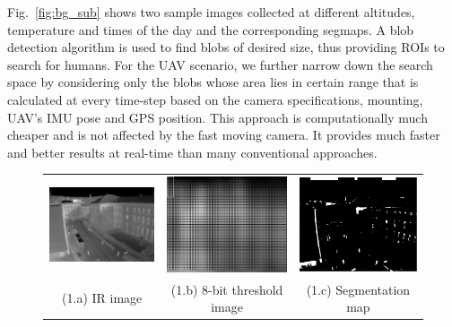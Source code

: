 \documentclass[runningheads]{llncs}
\begin{document}
Fig.~\ref{fig:bg_sub} shows two sample images collected at different altitudes, temperature and times of the day and the corresponding segmaps. A blob detection algorithm \cite{cvblob} is used to find blobs of desired size, thus providing ROIs to search for humans. For the UAV scenario, we further narrow down the search space by considering only the blobs whose area lies in certain range that is calculated at every time-step based on the camera specifications, mounting, UAV's IMU pose and GPS position. This approach is computationally much cheaper and is not affected by the fast moving camera. It provides much faster and better results at real-time than many conventional approaches.


\begin{figure}
  \centering
  \begin{tabular}{ccc}
    \includegraphics[width=4cm]{img/eps/bg_sub/CLA_Infrared_Image_screenshot_03-08-2015.eps} &
    \includegraphics[width=4cm]{img/eps/bg_sub/CLA_Threshold_values_high_screenshot_03-08-2015.eps} &
    \includegraphics[width=4cm]{img/eps/bg_sub/CLA_Segmentation_Map_screenshot_03-08-2015.eps} \\
    \small (1.a) IR image & 
    \small (1.b) 8-bit threshold image &
    \small (1.c) Segmentation map
  \end{tabular}

  \vspace{\floatsep}


\end{figure}
\end{document}
